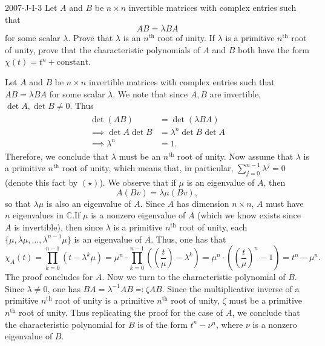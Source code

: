 \documentclass{article}
\begin{document}
	\begin{prb}{2007-J-I-3}
		Let $A$ and $B$ be $n \times n$ invertible matrices with complex entries such  that 
		\begin{equation*}
			AB = \lambda BA
		\end{equation*}
		for some scalar $\lambda$. Prove that $\lambda$ is an $n^{\text{th}}$ root of unity. If $\lambda$ is a primitive $n^{\text{th}}$ root of unity, prove that the characteristic polynomials of $A$ and $B$ both have the form $\chi(t) = t^{n} + \text{constant}$. 
	\end{prb}
	Let $A$ and $B$ be $n\times n$ invertible matrices with complex entries such that $AB = \lambda BA$ for some scalar $\lambda$. We note that since $A, B$ are invertible, $\det{A}, \det{B} \neq 0$. Thus 
	\begin{align*}
		\begin{split}
			\det(AB) &= \det(\lambda BA) \\
			\implies 
			\det{A}\det{B} &= \lambda^{n}\det{B}\det{A} \\
			\implies 
			\lambda^{n} &= 1. 
		\end{split}
	\end{align*}
	Therefore, we conclude that $\lambda$ must be an $n^{\text{th}}$ root of unity. Now assume that $\lambda$ is a primitive $n^{\text{th}}$ root of unity, which means that, in particular, $\sum_{j = 0}^{n-1}\lambda^{j} = 0$ (denote this fact by $(\star)$). We observe that if $\mu$ is an eigenvalue of $A$, then  
	\begin{equation*}
		A(Bv) = \lambda \mu (Bv), 
	\end{equation*}
	so that $\lambda \mu$ is also an eigenvalue of $A$. Since $A$ has dimension $n \times n$, $A$ must have $n$ eigenvalues in $\mathbb{C}$.If $\mu$ is a nonzero eigenvalue of $A$ (which we know exists since $A$ is invertible), then since $\lambda$ is a primitive $n^{\text{th}}$ root of unity, each $\{\mu, \lambda \mu, \ldots, \lambda^{n-1}\mu\}$ is an eigenvalue of $A$. Thus, one has that 
	\begin{equation*}
		\chi_{A}(t) = \prod_{k = 0}^{n-1}(t - \lambda^{k}\mu) = \mu^{n} \cdot \prod_{k = 0}^{n - 1}\left(\left(\frac{t}{\mu}\right) - \lambda^{k}\right) = \mu^{n} \cdot \left(\left(\frac{t}{\mu}\right)^{n} - 1\right) = t^{n} - \mu^{n}. 
	\end{equation*} 
	The proof concludes for $A$. Now we turn to the characteristic polynomial of $B$. Since $\lambda \neq 0$, one has $BA = \lambda^{-1}AB \eqqcolon \zeta AB$. Since the multiplicative inverse of a primitive $n^{\text{th}}$ root of unity is a primitive $n^{\text{th}}$ root of unity, $\zeta$ must be a primitive $n^{\text{th}}$ root of unity. Thus replicating the proof for the case of $A$, we conclude that the characteristic polynomial for $B$ is of the form $t^{n} - \nu^{n}$, where $\nu$ is a nonzero eigenvalue of $B$. 
	
\end{document}
